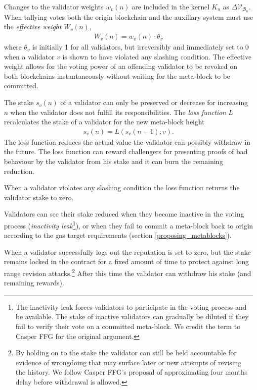 \documentclass[12pt,a4paper]{article}
\begin{document}
Changes to the validator weights $w_v(n)$ are included in the kernel $K_n$ as $\Delta\mathcal{V}_{\mathcal{B}_n}$.  When tallying votes both the origin blockchain and the auxiliary system must use the \emph{effective weight} $W_v(n)$,
\begin{align*}
  W_v(n) = w_v(n) \cdot \theta_v
\end{align*}
where $\theta_v$ is initially 1 for all validators, but irreversibly and immediately set to 0 when a validator $v$ is shown to have violated any slashing condition.
The effective weight allows for the voting power of an offending validator to be revoked on both blockchains instantaneously without waiting for the meta-block to be committed.

The stake $s_v(n)$ of a validator can only be preserved or decrease for increasing $n$ when the validator does not fulfill its responsibilities.
The \emph{loss function} $L$ recalculates the stake of a validator for the new meta-block height
\begin{align}
  s_v(n) = L(s_v(n-1); v).
\end{align}
The loss function reduces the actual value the validator can possibly withdraw in the future.  The loss function can reward challengers for presenting proofs of bad behaviour by the validator from his stake and it can burn the remaining reduction.

When a validator violates any slashing condition the loss function returns the validator stake to zero.

Validators can see their stake reduced when they become inactive in the voting process (\emph{inactivity leak}\footnote{
  The inactivity leak forces validators to participate in the voting process and be available.
  The stake of inactive validators can gradually be diluted if they fail to verify their vote on a committed meta-block.
  We credit the term to Casper FFG\cite{casperffg} for the original argument.
}), or when they fail to commit a meta-block back to origin according to the gas target requirements (section  \ref{proposing_metablocks}).

When a validator successfully logs out the reputation is set to zero, but the stake remains locked in the contract for a fixed amount of time to protect against long range revision attacks.\footnote{
  By holding on to the stake the validator can still be held accountable for evidence of wrongdoing that may surface later or new attempts of revising the history.
  We follow Casper FFG's proposal of approximating four months delay before withdrawal is allowed.}
After this time the validator can withdraw his stake (and remaining rewards).
\end{document}
